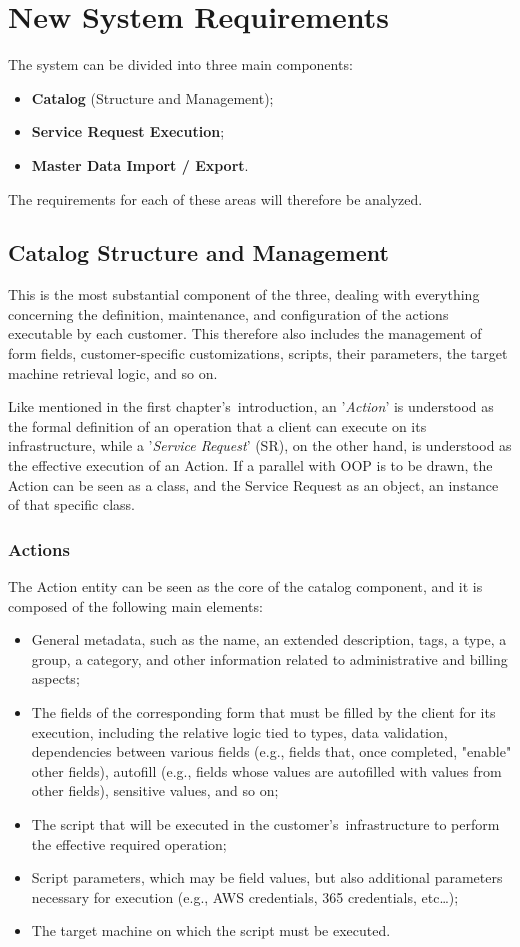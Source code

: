 \section{New System Requirements}
The system can be divided into three main components: 
\begin{itemize}
  \item \textbf{Catalog} (Structure and Management);
  \item \textbf{Service Request Execution};
  \item \textbf{Master Data Import / Export}.
\end{itemize} 
The requirements for each of these areas will therefore be analyzed.

\subsection{Catalog Structure and Management}
This is the most substantial component of the three, dealing with everything concerning the definition, maintenance, and configuration of the actions executable by each customer. This therefore also includes the management of form fields, customer-specific customizations, scripts, their parameters, the target machine retrieval logic, and so on.

Like mentioned in the first chapter's~introduction, an '\textit{Action}' is understood as the formal definition of an operation that a client can execute on its infrastructure, while a '\textit{Service Request}' (SR), on the other hand, is understood as the effective execution of an Action. 
If a parallel with OOP is to be drawn, the Action can be seen as a class, and the Service Request as an object, an instance of that specific class.

\subsubsection{Actions}
The Action entity can be seen as the core of the catalog component, and it is composed of the following main elements: 
\begin{itemize}
  \item General metadata, such as the name, an extended description, tags, a type, a group, a category, and other information related to administrative and billing aspects;
  \item The fields of the corresponding form that must be filled by the client for its execution, including the relative logic tied to types, data validation, dependencies between various fields (e.g., fields that, once completed, "enable" other fields), autofill (e.g., fields whose values are autofilled with values from other fields), sensitive values, and so on;
  \item The script that will be executed in the customer's~infrastructure to perform the effective required operation;
  \item Script parameters, which may be field values, but also additional parameters necessary for execution (e.g., AWS credentials, 365 credentials, etc\dots);
  \item The target machine on which the script must be executed.
\end{itemize}

